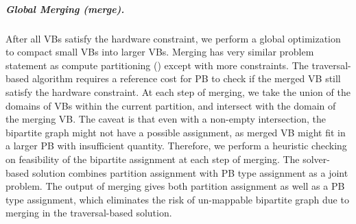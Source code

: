\subparagraph{Global Merging (merge).}
After all VBs satisfy the hardware constraint, we perform a global optimization to compact small VBs into  larger VBs. 
Merging has very similar problem statement as compute partitioning () except with more constraints.
The traversal-based algorithm requires a reference cost for PB to check if the merged VB still satisfy the hardware constraint.
At each step of merging, we take the union of the domains of VBs within the current partition, and intersect with the domain of the merging VB.
The caveat is that even with a non-empty intersection, the bipartite graph might not have a possible assignment, as merged VB might fit in a larger PB with insufficient quantity.
Therefore, we perform a heuristic checking on feasibility of the bipartite assignment at each step of merging.
The solver-based solution combines partition assignment with PB type assignment as a joint problem. 
The output of merging gives both partition assignment as well as a PB type assignment, which eliminates the risk of un-mappable bipartite graph due to merging in the traversal-based solution.



